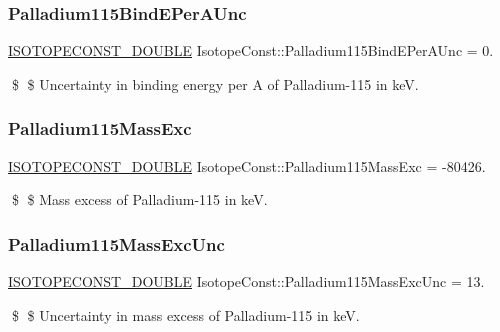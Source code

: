 \subsubsection{\texorpdfstring{Palladium115\+Bind\+E\+Per\+A\+Unc}{Palladium115BindEPerAUnc}}
{\footnotesize\ttfamily \mbox{\hyperlink{group___isotope_const-_macros_ga8f45a7272ce02c0b4c65c44636ed719a}{I\+S\+O\+T\+O\+P\+E\+C\+O\+N\+S\+T\+\_\+\+D\+O\+U\+B\+LE}} Isotope\+Const\+::\+Palladium115\+Bind\+E\+Per\+A\+Unc = 0.}

\$ \$ Uncertainty in binding energy per A of Palladium-\/115 in keV. \mbox{\label{group___isotope_const-_palladium-_pd115_gabce4a6614e5a139ded079cd894850a21}} 
\subsubsection{\texorpdfstring{Palladium115\+Mass\+Exc}{Palladium115MassExc}}
{\footnotesize\ttfamily \mbox{\hyperlink{group___isotope_const-_macros_ga8f45a7272ce02c0b4c65c44636ed719a}{I\+S\+O\+T\+O\+P\+E\+C\+O\+N\+S\+T\+\_\+\+D\+O\+U\+B\+LE}} Isotope\+Const\+::\+Palladium115\+Mass\+Exc = -\/80426.}

\$ \$ Mass excess of Palladium-\/115 in keV. \mbox{\label{group___isotope_const-_palladium-_pd115_gaf7d3c430d15873a2eb8c1fc117e1fec5}} 
\subsubsection{\texorpdfstring{Palladium115\+Mass\+Exc\+Unc}{Palladium115MassExcUnc}}
{\footnotesize\ttfamily \mbox{\hyperlink{group___isotope_const-_macros_ga8f45a7272ce02c0b4c65c44636ed719a}{I\+S\+O\+T\+O\+P\+E\+C\+O\+N\+S\+T\+\_\+\+D\+O\+U\+B\+LE}} Isotope\+Const\+::\+Palladium115\+Mass\+Exc\+Unc = 13.}

\$ \$ Uncertainty in mass excess of Palladium-\/115 in keV. \mbox{\label{group___isotope_const-_palladium-_pd115_ga2c344c4f7470ba7d6ef86de83cc3efc4}} 
